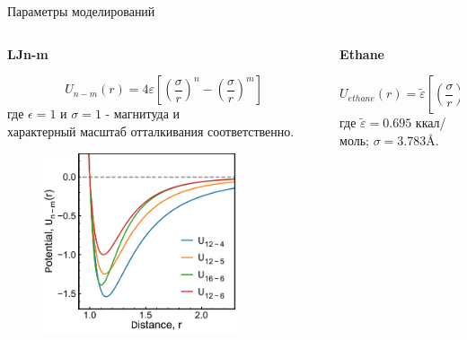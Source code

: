 \documentclass{beamer}
\newcommand{\jj}{\righthyphenmin=20 \justifying}
\begin{document}
\begin{frame}{Параметры моделирований}
\footnotesize{

\begin{columns}
\begin{column}{0.5\linewidth}

\centering \textbf{LJn-m}

\begin{equation}
U_{n-m}(r)=4 \varepsilon\left[\left(\frac{\sigma}{r}\right)^{n}-\left(\frac{\sigma}{r}\right)^{m}\right]
\label{eqGenLJ}
\end{equation}
\jj где $\epsilon = 1$ и $\sigma = 1$ - магнитуда и \\ характерный масштаб отталкивания соответственно.

\vspace{0.0cm}

\begin{figure}
\centering
\includegraphics[width=0.8\textwidth]{LJ_no_norm.pdf}
\end{figure}

\end{column}

\begin{column}{0.5\linewidth}

\vspace{0.4cm}
\centering \textbf{Ethane}

\begin{equation}
U_{ethane}(r) = \tilde \varepsilon\left[\left(\frac{\sigma}{r}\right)^{16}-\left(\frac{\sigma}{r}\right)^{6}\right],
\label{eqEthan}
\end{equation}
\jj где $\tilde \varepsilon = 0.695$ ккал/моль; $\sigma = 3.783$\AA.


\end{column}
\end{columns}}
\end{frame}
\end{document}
